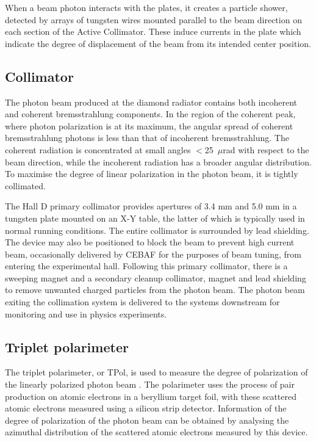 When a beam photon interacts with the plates, it creates a particle shower, detected by arrays of tungsten wires mounted parallel to the beam direction on each section of the Active Collimator.
These induce currents in the plate which indicate the degree of displacement of the beam from its intended center position.

\subsection{Collimator}
The photon beam produced at the diamond radiator contains both incoherent and coherent bremsstrahlung components.
In the region of the coherent peak, where photon polarization is at its maximum, the angular spread of coherent bremsstrahlung photons is less than that of incoherent bremsstrahlung.
The coherent radiation is concentrated at small angles $<$25~$\mu$rad with respect to the beam direction, while the incoherent radiation has a broader angular distribution.
To maximise the degree of linear polarization in the photon beam, it is tightly collimated.

The Hall D primary collimator provides apertures of 3.4 mm and 5.0 mm in a tungsten plate mounted on an X-Y table, the latter of which is typically used in normal \GX{} running conditions.
The entire collimator is surrounded by lead shielding.
The device may also be positioned to block the beam to prevent high current beam, occasionally delivered by CEBAF for the purposes of beam tuning, from entering the experimental hall. Following this primary collimator, there is a sweeping magnet and a secondary cleanup collimator, magnet and 
lead shielding to remove unwanted charged particles from the photon beam. The photon beam exiting the collimation system is delivered to the systems downstream for monitoring and use in physics experiments.

\subsection{Triplet polarimeter \label{sec:tpol}}
The triplet polarimeter, or TPol, is used to measure the degree of polarization of the linearly polarized photon beam \cite{DUGGER2017115}.
The polarimeter uses the process of pair production on atomic electrons in a beryllium target foil, with these scattered atomic electrons measured using a silicon strip detector.
Information of the degree of polarization of the photon beam can be obtained by analysing the azimuthal distribution of the scattered atomic electrons measured by this device.

